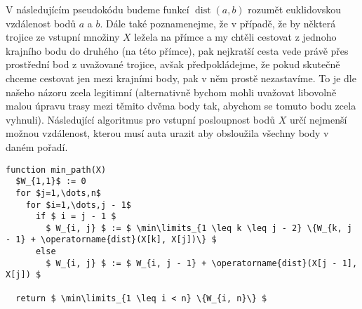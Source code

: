 \documentclass[12pt,a4paper]{article}
\theoremstyle{plain}
\newcommand\addfunctions[1]{%
  \lstset{morekeywords=[4]{#1}}}
\begin{document}
\pagestyle{fancy}                      %
\fancyhf{}                             %
\addtolength{\topmargin}{-30 pt}                   %
\setlength{\headsep}{10 pt}                      %
\renewcommand{\headrulewidth}{1 pt}                %

\addfunctions{min_path}

V následujícím pseudokódu budeme funkcí $ \operatorname{dist}(a,b) $ rozumět euklidovskou vzdálenost bodů $ a $ a $ b $. Dále také poznamenejme, že v případě, že by některá trojice ze vstupní množiny $ X $ ležela na přímce a my chtěli cestovat z jednoho krajního bodu do druhého (na této přímce), pak nejkratší cesta vede právě přes prostřední bod z uvažované trojice, avšak předpokládejme, že pokud skutečně chceme cestovat jen mezi krajními body, pak v něm prostě nezastavíme. To je dle našeho názoru zcela legitimní (alternativně bychom mohli uvažovat libovolně malou úpravu trasy mezi těmito dvěma body tak, abychom se tomuto bodu zcela vyhnuli). Následující algoritmus pro vstupní posloupnost bodů $ X $ určí nejmenší možnou vzdálenost, kterou musí auta urazit aby obsloužila všechny body v daném pořadí.

\begin{lstlisting}[mathescape]
function min_path(X)
  $W_{1,1}$ := 0
  for $j=1,\dots,n$
    for $i=1,\dots,j - 1$
      if $ i = j - 1 $
        $ W_{i, j} $ := $ \min\limits_{1 \leq k \leq j - 2} \{W_{k, j - 1} + \operatorname{dist}(X[k], X[j])\} $
      else
        $ W_{i, j} $ := $ W_{i, j - 1} + \operatorname{dist}(X[j - 1], X[j]) $
  
  return $ \min\limits_{1 \leq i < n} \{W_{i, n}\} $

\end{lstlisting}
\end{document}
